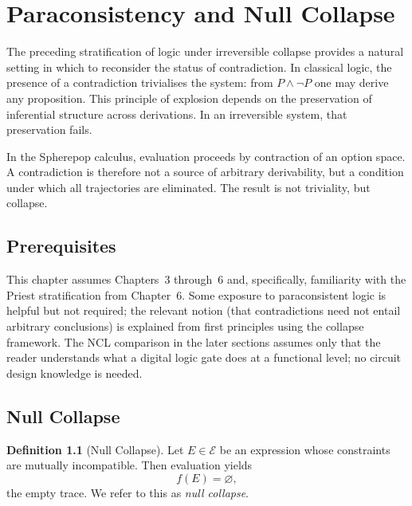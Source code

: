 \documentclass[12pt, oneside]{amsbook}
\theoremstyle{plain}
\theoremstyle{definition}
\newtheorem{definition}[theorem]{Definition}
\theoremstyle{remark}
\newcommand{\Expr}{\mathcal{E}}
\newcommand{\evalf}{f}
\begin{document}

\chapter{Paraconsistency and Null Collapse}
\label{ch:paraconsistent}

The preceding stratification of logic under irreversible collapse provides a
natural setting in which to reconsider the status of contradiction. In
classical logic, the presence of a contradiction trivialises the system: from
$P \land \neg P$ one may derive any proposition. This principle of explosion
depends on the preservation of inferential structure across derivations. In an
irreversible system, that preservation fails.

In the Spherepop calculus, evaluation proceeds by contraction of an option
space. A contradiction is therefore not a source of arbitrary derivability,
but a condition under which all trajectories are eliminated. The result is not
triviality, but collapse.

\section{Prerequisites}

This chapter assumes Chapters~3 through~6 and, specifically, familiarity with the Priest stratification from Chapter~6. Some exposure to paraconsistent logic is helpful but not required; the relevant notion (that contradictions need not entail arbitrary conclusions) is explained from first principles using the collapse framework. The NCL comparison in the later sections assumes only that the reader understands what a digital logic gate does at a functional level; no circuit design knowledge is needed.

\section{Null Collapse}
\label{sec:para:null}

\begin{definition}[Null Collapse]
\label{def:null-collapse}
Let $E \in \Expr$ be an expression whose constraints are mutually
incompatible. Then evaluation yields
\[
  \evalf(E) = \varnothing,
\]
the empty trace. We refer to this as \emph{null collapse}.
\end{definition}
\end{document}
